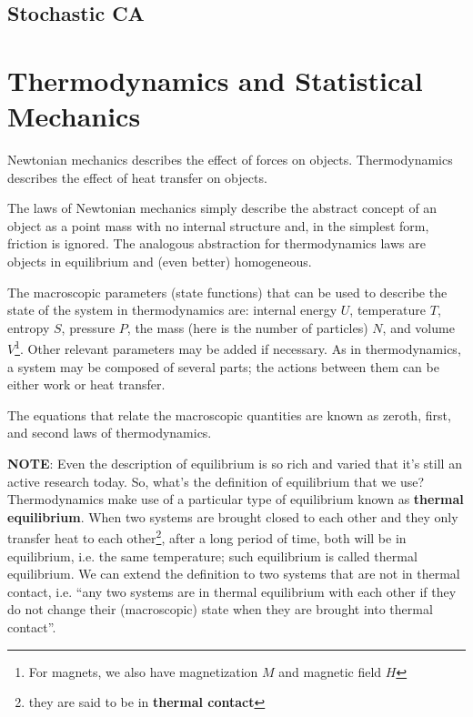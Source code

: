 \subsection{Stochastic CA}
\label{sec:stochastic-ca}

\section{Thermodynamics and Statistical Mechanics}
\label{sec:therm-stat-mech}

Newtonian mechanics describes the effect of forces on
objects. Thermodynamics describes the effect of heat transfer on
objects.

The laws of Newtonian mechanics simply describe the abstract concept
of an object as a point mass with no internal structure and, in the
simplest form, friction is ignored. The analogous abstraction for
thermodynamics laws are objects in equilibrium and (even better)
homogeneous. 

The macroscopic parameters (state functions) that can be used to
describe the state of the system in thermodynamics are: internal
energy $U$, temperature $T$, entropy $S$, pressure $P$, the mass (here
is the number of particles) $N$, and volume
$V$\footnote{For magnets, we also have magnetization $M$ and magnetic
  field $H$}. Other relevant parameters may be added if necessary.
As in thermodynamics, a system may be composed of several parts; the
actions between them can be either work or heat transfer.

The equations that relate the macroscopic quantities are known as
zeroth, first, and second laws of thermodynamics.

{\bf NOTE}: Even the description of equilibrium is so rich and varied
that it's still an active research today.  So, what's the definition
of equilibrium that we use? Thermodynamics make use of a particular
type of equilibrium known as {\bf thermal equilibrium}. When two
systems are brought closed to each other and they only transfer heat
to each other\footnote{they are said to be in {\bf thermal contact}},
after a long period of time, both will be in equilibrium, i.e. the
same temperature; such equilibrium is called thermal equilibrium. We
can extend the definition to two systems that are not in thermal
contact, i.e. ``any two systems are in thermal equilibrium with each
other if they do not change their (macroscopic) state when they are
brought into thermal contact''. 

